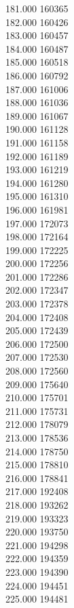 { 181.000	160365 \\
 182.000	160426 \\
 183.000	160457 \\
 184.000	160487 \\
 185.000	160518 \\
 186.000	160792 \\
 187.000	161006 \\
 188.000	161036 \\
 189.000	161067 \\
 190.000	161128 \\
 191.000	161158 \\
 192.000	161189 \\
 193.000	161219 \\
 194.000	161280 \\
 195.000	161310 \\
 196.000	161981 \\
 197.000	172073 \\
 198.000	172164 \\
 199.000	172225 \\
 200.000	172256 \\
 201.000	172286 \\
 202.000	172347 \\
 203.000	172378 \\
 204.000	172408 \\
 205.000	172439 \\
 206.000	172500 \\
 207.000	172530 \\
 208.000	172560 \\
 209.000	175640 \\
 210.000	175701 \\
 211.000	175731 \\
 212.000	178079 \\
 213.000	178536 \\
 214.000	178750 \\
 215.000	178810 \\
 216.000	178841 \\
 217.000	192408 \\
 218.000	193262 \\
 219.000	193323 \\
 220.000	193750 \\
 221.000	194298 \\
 222.000	194359 \\
 223.000	194390 \\
 224.000	194451 \\
 225.000	194481 \\
}
